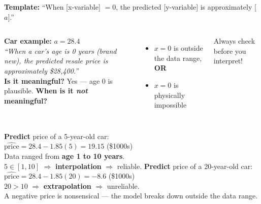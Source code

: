 \documentclass[aspectratio=169, 11pt]{beamer}
\begin{document}
\begin{frame}[t, plain]
  \vspace{0.25cm}
  \vspace{0.15cm}
  \textbf{Template:} ``When [x-variable] $= 0$, the predicted [y-variable] is approximately [$a$].''
  \vspace{0.3cm}
  \begin{columns}
      \textbf{Car example:} $a = 28.4$\\[8pt]
      \textit{``When a car's age is 0 years (brand new), the predicted resale price is
      approximately \$28{,}400.''}\\[8pt]
      \textbf{Is it meaningful?} Yes --- age 0 is plausible.
      \textbf{When is it \emph{not} meaningful?}
      \begin{itemize}
        \item $x = 0$ is outside the data range, \textbf{OR}
        \item $x = 0$ is physically impossible
      \end{itemize}
      \vspace{6pt}
      \textcolor{redacc}{\small Always check before you interpret!}
  \end{columns}
\end{frame}

\begin{frame}[t, plain]
  \vspace{0.25cm}
  \vspace{0.15cm}
  \begin{columns}
      \textbf{Predict} price of a 5-year-old car:\\[6pt]
      $\widehat{\text{price}} = 28.4 - 1.85(5) = 19.15$ (\$1000s)\\[8pt]
      Data ranged from \textbf{age 1 to 10 years}.\\[4pt]
      $5 \in [1, 10]$ $\Rightarrow$ \textbf{interpolation} $\Rightarrow$ reliable.
      \textbf{Predict} price of a 20-year-old car:\\[6pt]
      $\widehat{\text{price}} = 28.4 - 1.85(20) = -8.6$ (\$1000s)\\[8pt]
      $20 > 10$ $\Rightarrow$ \textbf{extrapolation} $\Rightarrow$ unreliable.\\[4pt]
      \textcolor{redacc}{\small A negative price is nonsensical ---
      the model breaks down outside the data range.}
  \end{columns}
\end{frame}
\end{document}
